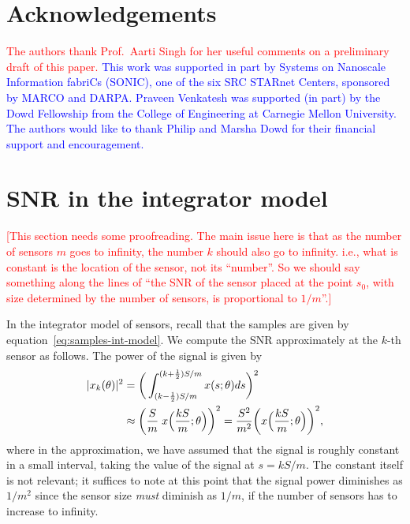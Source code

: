 \documentclass[conference,letterpaper]{IEEEtran}
\DeclarePairedDelimiter\abs{\lvert}{\rvert}
\begin{document}
\section*{Acknowledgements}

\textcolor{red}{The authors thank Prof.\ Aarti Singh for her useful comments on
	a preliminary draft of this paper.}
\textcolor{blue}{
This work was supported in part by Systems on Nanoscale Information fabriCs
(SONIC), one of the six SRC STARnet Centers, sponsored by MARCO and DARPA.
Praveen Venkatesh was supported (in part) by the Dowd Fellowship from the
College of Engineering at Carnegie Mellon University. The authors would like to
thank Philip and Marsha Dowd for their financial support and encouragement.
}





\newpage

\appendices

\section{SNR in the integrator model}
\label{app:integrator-snr}

\textcolor{red}{[This section needs some proofreading. The main issue here is
	that as the number of sensors $m$ goes to infinity, the number $k$ should
	also go to infinity. i.e., what is constant is the location of the sensor,
	not its ``number''. So we should say something along the lines of ``the SNR
	of the sensor placed at the point $s_0$, with size determined by the number
	of sensors, is proportional to $1/m$''.]}

In the integrator model of sensors, recall that the samples are given by
equation~\eqref{eq:samples-int-model}. We compute the SNR approximately at the
$k$-th sensor as follows. The power of the signal is given by
\begin{align}
	\abs{x_k(\theta)}^2 &= \bigg(\int_{(k-\frac{1}{2})S/m}^{(k+\frac{1}{2})S/m} x(s;\theta) ds\bigg)^2 \\
	&\approx \bigg(\frac{S}{m} \; x\Big(\frac{kS}{m}; \theta\Big)\bigg)^2 = \frac{S^2}{m^2} \bigg(x\Big(\frac{kS}{m}; \theta\Big)\bigg)^2 \label{eq:signal-power-k},
\end{align}
where in the approximation, we have assumed that the signal is roughly constant
in a small interval, taking the value of the signal at $s = kS/m$. The constant
itself is not relevant; it suffices to note at this point that the signal power
diminishes as $1/m^2$ since the sensor size \emph{must} diminish as $1/m$, if
the number of sensors has to increase to infinity.
\end{document}
